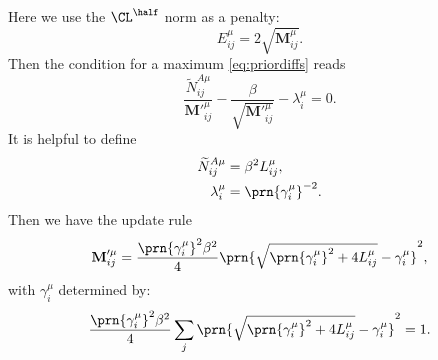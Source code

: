 \documentclass[12pt]{article}
\newcommand{\M}{\mathbf{M}}
\begin{document}
Here we use the  $\CL^\half$ norm as a penalty:
%
\begin{equation}\label{eq:Lhalfpenalty}
  E^\mu_{ij} = 2\sqrt{\M^\mu_{ij}}.
\end{equation}
%
Then the condition for a maximum \eqref{eq:priordiffs} reads
%
\begin{equation}\label{eq:Lhalfpriormax}
  \frac{ \widetilde{N}^{A\mu}_{ij} }{ \M'^\mu_{ij} }  - \frac{\beta}{\sqrt{\M'^\mu_{ij}}} - \lambda^\mu_{i} = 0.
\end{equation}
%
It is helpful to define
%
\begin{equation}\label{eq:Lhalfvars}
\begin{aligned}
  \widetilde{N}^{A\mu}_{ij} &= \beta^2 L^\mu_{ij}, \\
  \lambda^\mu_i &= \prn{\gamma^\mu_i}^{-2}.
\end{aligned}
\end{equation}
%
Then we have the update rule
%
\begin{equation}\label{eq:Lhalfupdate}
  \M'^\mu_{ij} = \frac{ \prn{\gamma^\mu_i}^2 \beta^2 }{ 4 } \prn{\sqrt{ \prn{\gamma^\mu_i}^2 + 4L^\mu_{ij} } - \gamma^\mu_i }^2,
\end{equation}
%
with $\gamma^\mu_i$ determined by:
%
\begin{equation}\label{eq:Lhalfnorm}
    \frac{ \prn{\gamma^\mu_i}^2 \beta^2 }{ 4 } \sum_j \prn{\sqrt{\prn{\gamma^\mu_i}^2 + 4L^\mu_{ij}} - \gamma^\mu_i}^2 = 1.
\end{equation}
%















\end{document}

